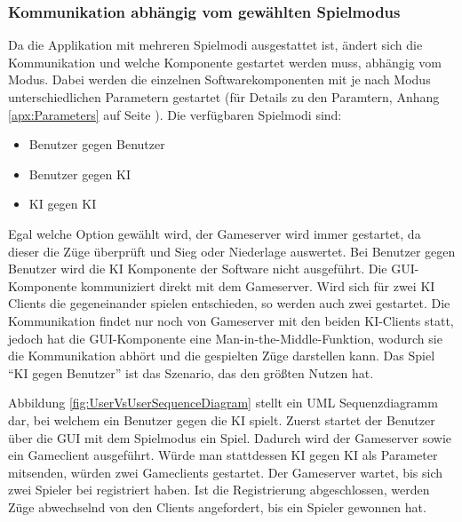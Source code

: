 \documentclass[12pt,a4paper,bibliography=totocnumbered,listof=totocnumbered]{article}
\begin{document}
\subsubsection{Kommunikation abhängig vom gewählten Spielmodus}
\label{chap:NetworkModie}
Da die Applikation mit mehreren Spielmodi ausgestattet ist, ändert sich die Kommunikation und welche Komponente gestartet werden muss, abhängig vom Modus.
Dabei werden die einzelnen Softwarekomponenten mit je nach Modus unterschiedlichen Parametern gestartet (für Details zu den Paramtern, Anhang \ref{apx:Parameters}
auf Seite \pageref{apx:Parameters}).
Die verfügbaren Spielmodi sind:
\begin{itemize}
    \item Benutzer gegen Benutzer
    \item Benutzer gegen KI
    \item KI gegen KI
\end{itemize}
Egal welche Option gewählt wird, der Gameserver wird immer gestartet, da dieser die Züge überprüft und Sieg oder Niederlage auswertet.
Bei Benutzer gegen Benutzer wird die KI Komponente der Software nicht ausgeführt. Die GUI-Komponente kommuniziert direkt mit dem Gameserver.
Wird sich für zwei KI Clients die gegeneinander spielen entschieden, so werden auch zwei gestartet.
Die Kommunikation findet nur noch von Gameserver mit den beiden KI-Clients statt, jedoch hat die GUI-Komponente eine Man-in-the-Middle-Funktion,
wodurch sie die Kommunikation abhört und die gespielten Züge darstellen kann.
Das Spiel ``KI gegen Benutzer'' ist das Szenario, das den größten Nutzen hat.

Abbildung \ref{fig:UserVsUserSequenceDiagram} stellt ein UML Sequenzdiagramm dar, bei welchem ein Benutzer gegen die KI spielt.
Zuerst startet der Benutzer über die GUI mit dem Spielmodus ein Spiel. Dadurch wird der Gameserver sowie ein
Gameclient ausgeführt. Würde man stattdessen KI gegen KI als Parameter mitsenden, würden zwei Gameclients gestartet. 
Der Gameserver wartet, bis sich zwei Spieler bei registriert haben. Ist die Registrierung abgeschlossen, werden Züge
abwechselnd von den Clients angefordert, bis ein Spieler gewonnen hat.
\end{document}
